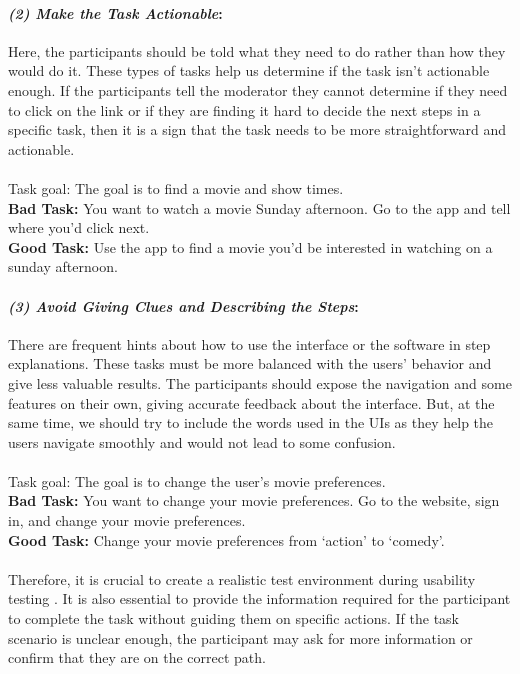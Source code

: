 \paragraph{\textit{(2) Make the Task Actionable}:}
Here, the participants should be told what they need to do rather than how they would do it.
These types of tasks help us determine if the task isn't actionable enough.  
If the participants tell the moderator they cannot determine if they need to click on the link or if they are finding it hard to decide the next steps in a specific task, then it is a sign that the task needs to be more straightforward and actionable. \\\\
Task goal: The goal is to find a movie and show times. \\
\textbf{Bad Task: } You want to watch a movie Sunday afternoon. Go to the app and tell where you’d click next. \\
\textbf{Good Task: } Use the app to find a movie you'd be interested in watching on a sunday afternoon. \\

\paragraph{\textit{(3) Avoid Giving Clues and Describing the Steps}:}
There are frequent hints about how to use the interface or the software in step explanations.
These tasks must be more balanced with the users' behavior and give less valuable results.   
The participants should expose the navigation and some features on their own, giving accurate feedback about the interface.
But, at the same time, we should try to include the words used in the UIs as they help the users navigate smoothly and would not lead to some confusion. \\\\
Task goal: The goal is to change the user's movie preferences. \\
\textbf{Bad Task: } You want to change your movie preferences. Go to the website, sign in, and change your movie preferences. \\
\textbf{Good Task: } Change your movie preferences from `action' to `comedy'. \\\\
Therefore, it is crucial to create a realistic test environment during usability testing \cite{article:usability:doesburg}. 
It is also essential to provide the information required for the participant to complete the task without guiding them on specific actions. 
If the task scenario is unclear enough, the participant may ask for more information or confirm that they are on the correct path.

